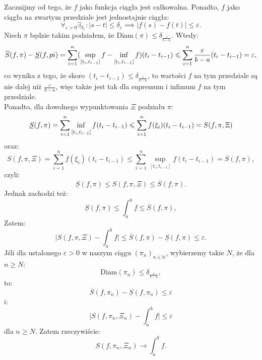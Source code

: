 \documentclass{article}
\numberwithin{defi}{section}
\numberwithin{defi}{section}
\newcommand{\N}{\mathbb{N}}
\renewcommand{\inf}{\mathop{\mathrm{inf}\vphantom{\mathrm{sup}}}}
\newcommand{\Sd}{\underline{S}}
\newcommand{\Sg}{\overline{S}}
\newcommand{\przedz}[2]{[#1 _ {#2}, #1_{#2 - 1}]}
\providecommand{\eps}{\varepsilon}
\renewcommand{\geq}{\geqslant}
\renewcommand{\leq}{\leqslant}
\newcommand{\ciag}[1]{(#1_{n})_{n \in \N}}
\begin{document}
\begin{dow}{}
    Zacznijmy od tego, że $f$ jako funkcja ciągła jest całkowalna. Ponadto, $f$ jako ciągła na zwartym przedziale jest jednostajnie ciągła: \begin{equation}
        \forall_{\eps > 0} \exists_{\delta_\eps}: |s - t| \leq \delta_\eps \implies |f(s) - f(t)| \leq \eps.
    \end{equation} Niech $\pi$ będzie takim podziałem, że $\text{Diam}(\pi) \leq \delta_{\frac{\eps}{b - a}}$. Wtedy: \begin{equation}
        \Sg(f, \pi) - \Sd(f, pi) = \sum_{i = 1}^{n} (\sup_{\przedz{t}{i}} f - \inf_{\przedz{t}{i}} f) (t_i - t_{i -1}) \leq \sum_{i = 1}^{n} \frac{\eps}{b - a}(t_i - t_{i -1}) = \eps,
    \end{equation} co wynika z tego, że skoro $(t_i - t_{i -1}) \leq \delta_{\frac{\eps}{b - a}}$, to wartości $f$ na tym przedziale są nie dalej niż $\frac{\eps}{b - a}$, więc także jest tak dla supremum i infimum $f$ na tym przedziale. \\
    Ponadto, dla dowolnego wypunktowania $\Xi$ podziału $\pi$: \begin{equation}
        \Sd(f, \pi) =  \sum_{i = 1}^{n} \inf_{\przedz{t}{i}} f (t_i - t_{i -1}) \leq \sum_{i = 1}^{n} f(\xi_i) (t_i - t_{i -1})  = S(f, \pi, \Xi)
    \end{equation} oraz: \begin{equation}
        S(f, \pi, \Xi) = \sum_{i = 1}^{n} f(\xi_i) (t_i - t_{i -1}) \leq \sum_{i = 1}^{n} \sup_{\przedz{t}{i}} f (t_i - t_{i -1}) =  \Sg(f, \pi),
    \end{equation} czyli: \begin{equation}
        \Sd(f, \pi) \leq  S(f, \pi, \Xi)  \leq \Sg(f, \pi).
    \end{equation} Jednak zachodzi też: \begin{equation}
        \Sd(f, \pi) \leq  \int_{a}^{b} f \leq \Sg(f, \pi),
    \end{equation} Zatem: \begin{equation}
        \big| S(f, \pi, \Xi)  - \int_{a}^{b} f \big| \leq \Sg(f, \pi) - \Sd(f, \pi) \leq \eps.
    \end{equation} Jśli dla ustalonego $\eps > 0$ w naszym ciągu $\ciag{\pi}$, wybierzemy takie $N$, że dla $n \geq N$: \begin{equation}
        \text{Diam}(\pi_n) \leq \delta_{\frac{\eps}{b- a}},
    \end{equation} to: \begin{equation}
        \Sg(f, \pi_n) - \Sd(f, \pi_n) \leq \eps 
    \end{equation} i: \begin{equation}
        \big| S(f, \pi_n, \Xi_n)  - \int_{a}^{b} f \big| \leq \eps
    \end{equation} dla $n \geq N$. Zatem rzeczywiście: \begin{equation}
        S(f, \pi_n, \Xi_n) \to  \int_{a}^{b} f.
    \end{equation}
\end{dow}
\end{document}
